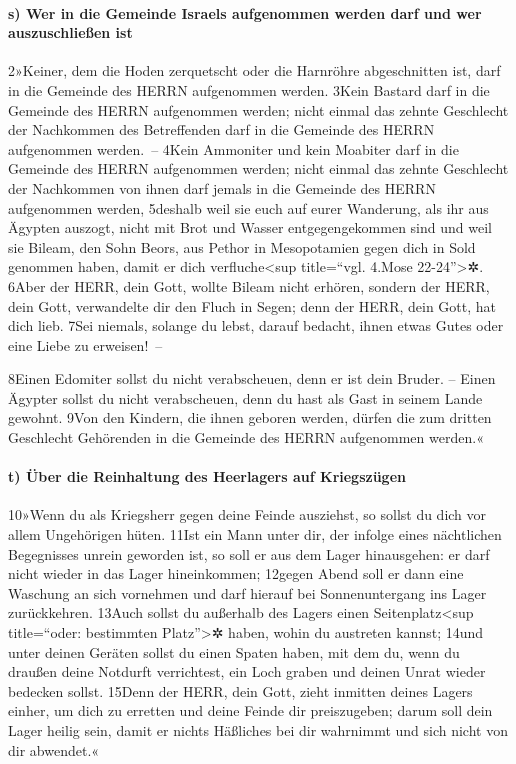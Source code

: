 \hypertarget{s-wer-in-die-gemeinde-israels-aufgenommen-werden-darf-und-wer-auszuschlieuxdfen-ist}{%
\paragraph{s) Wer in die Gemeinde Israels aufgenommen werden darf und
wer auszuschließen
ist}\label{s-wer-in-die-gemeinde-israels-aufgenommen-werden-darf-und-wer-auszuschlieuxdfen-ist}}

2»Keiner, dem die Hoden zerquetscht oder die Harnröhre abgeschnitten
ist, darf in die Gemeinde des HERRN aufgenommen werden. 3Kein Bastard
darf in die Gemeinde des HERRN aufgenommen werden; nicht einmal das
zehnte Geschlecht der Nachkommen des Betreffenden darf in die Gemeinde
des HERRN aufgenommen werden.~-- 4Kein Ammoniter und kein Moabiter darf
in die Gemeinde des HERRN aufgenommen werden; nicht einmal das zehnte
Geschlecht der Nachkommen von ihnen darf jemals in die Gemeinde des
HERRN aufgenommen werden, 5deshalb weil sie euch auf eurer Wanderung,
als ihr aus Ägypten auszogt, nicht mit Brot und Wasser entgegengekommen
sind und weil sie Bileam, den Sohn Beors, aus Pethor in Mesopotamien
gegen dich in Sold genommen haben, damit er dich verfluche\textless sup
title=``vgl. 4.Mose 22-24''\textgreater✲. 6Aber der HERR, dein Gott,
wollte Bileam nicht erhören, sondern der HERR, dein Gott, verwandelte
dir den Fluch in Segen; denn der HERR, dein Gott, hat dich lieb. 7Sei
niemals, solange du lebst, darauf bedacht, ihnen etwas Gutes oder eine
Liebe zu erweisen!~--

8Einen Edomiter sollst du nicht verabscheuen, denn er ist dein Bruder.
-- Einen Ägypter sollst du nicht verabscheuen, denn du hast als Gast in
seinem Lande gewohnt. 9Von den Kindern, die ihnen geboren werden, dürfen
die zum dritten Geschlecht Gehörenden in die Gemeinde des HERRN
aufgenommen werden.«

\hypertarget{t-uxfcber-die-reinhaltung-des-heerlagers-auf-kriegszuxfcgen}{%
\paragraph{t) Über die Reinhaltung des Heerlagers auf
Kriegszügen}\label{t-uxfcber-die-reinhaltung-des-heerlagers-auf-kriegszuxfcgen}}

10»Wenn du als Kriegsherr gegen deine Feinde ausziehst, so sollst du
dich vor allem Ungehörigen hüten. 11Ist ein Mann unter dir, der infolge
eines nächtlichen Begegnisses unrein geworden ist, so soll er aus dem
Lager hinausgehen: er darf nicht wieder in das Lager hineinkommen;
12gegen Abend soll er dann eine Waschung an sich vornehmen und darf
hierauf bei Sonnenuntergang ins Lager zurückkehren. 13Auch sollst du
außerhalb des Lagers einen Seitenplatz\textless sup title=``oder:
bestimmten Platz''\textgreater✲ haben, wohin du austreten kannst; 14und
unter deinen Geräten sollst du einen Spaten haben, mit dem du, wenn du
draußen deine Notdurft verrichtest, ein Loch graben und deinen Unrat
wieder bedecken sollst. 15Denn der HERR, dein Gott, zieht inmitten
deines Lagers einher, um dich zu erretten und deine Feinde dir
preiszugeben; darum soll dein Lager heilig sein, damit er nichts
Häßliches bei dir wahrnimmt und sich nicht von dir abwendet.«

